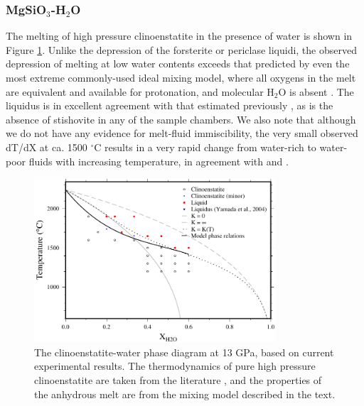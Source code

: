 \documentclass[review]{elsarticle}
\begin{document}
\subsubsection{MgSiO$_3$-H$_2$O}
The melting of high pressure clinoenstatite in the presence of water is shown in Figure \ref{fig:eoH}. Unlike the depression of the forsterite or periclase liquidi, the observed depression of melting at low water contents exceeds that predicted by even the most extreme commonly-used ideal mixing model, where all oxygens in the melt are equivalent and available for protonation, and molecular H$_2$O is absent \citep{SS1985}. The liquidus is in excellent agreement with that estimated previously \citep{YII2004}, as is the absence of stishovite in any of the sample chambers. We also note that although we do not have any evidence for melt-fluid immiscibility, the very small observed dT/dX at ca. 1500 $^{\circ}$C results in a very rapid change from water-rich to water-poor fluids with increasing temperature, in agreement with \cite{Inoue1994} and \cite{YII2004}.


\begin{figure}[ht!]
  \centering
      \includegraphics[width=0.8\textwidth]{figures/enstatite}
  \caption{The clinoenstatite-water phase diagram at 13 GPa, based on current experimental results. The thermodynamics of pure high pressure clinoenstatite are taken from the literature \citep{SLB2011}, and the properties of the anhydrous melt are from the mixing model described in the text.}
  \label{fig:eoH}
\end{figure}

\clearpage
\end{document}
